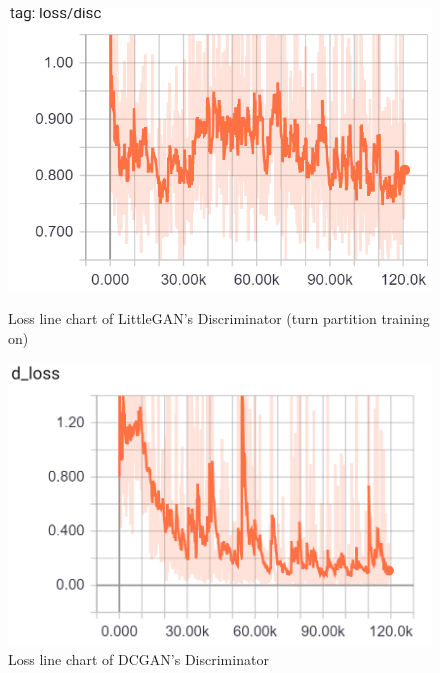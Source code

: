     \begin{figure}
        \begin{minipage}[t]{0.49\linewidth}
            \centering
            \includegraphics[width=\textwidth]{figures/loss_part_on_d.png}
            \caption{Loss line chart of LittleGAN's Discriminator (turn partition training on)}
            \label{loss_part_on_d}
        \end{minipage}
            \hfill
        \begin{minipage}[t]{0.49\linewidth}
            \centering
            \includegraphics[width=\textwidth]{figures/loss_dcgan_d.png}
            \caption{Loss line chart of DCGAN's Discriminator}
            \label{loss_dcgan_d}
        \end{minipage}
    \end{figure}

